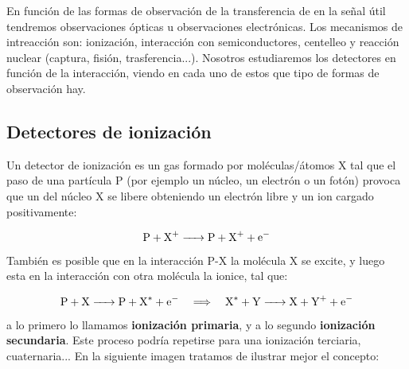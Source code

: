 En función de las formas de observación de la transferencia de en la señal útil tendremos observaciones ópticas u observaciones electrónicas. Los mecanismos de intreacción son: ionización, interacción con semiconductores, centelleo y reacción nuclear (captura, fisión, trasferencia...). Nosotros estudiaremos los detectores en función de la interacción, viendo en cada uno de estos que tipo de formas de observación hay. 

\subsection{Detectores de ionización}

Un detector de ionización es un gas formado por moléculas/átomos X tal que el paso de una partícula P (por ejemplo un núcleo, un electrón o un fotón) provoca que un del núcleo X se libere obteniendo un electrón libre y un ion cargado positivamente:

\[ \ce{P + X+ -> P +  X+ + e-} \]
También es posible que en la interacción P-X la molécula X se excite, y luego esta en la interacción con otra molécula la ionice, tal que: 

\[ \ce{P + X -> P +  X^* + e-} \quad \Longrightarrow \quad  \ce{X^* + Y -> X + Y^+ + e-}  \]
a lo primero lo llamamos \textbf{ionización primaria}, y a lo segundo \textbf{ionización secundaria}. Este proceso podría repetirse para una ionización terciaria, cuaternaria... En la siguiente imagen tratamos de ilustrar mejor el concepto: 

